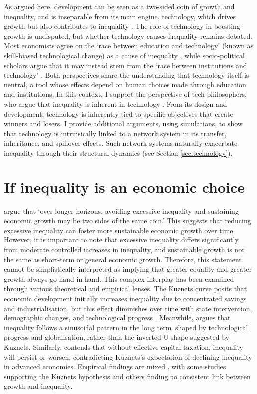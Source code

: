 \documentclass[12pt]{article}
\begin{document}
As argued here, development can be seen as a two-sided coin of growth and inequality, and is inseparable from its main engine, technology, which drives growth but also contributes to inequality \parencite{freeman2011technology}. The role of technology in boosting growth is undisputed, but whether technology causes inequality remains debated. Most economists agree on the `race between education and technology' (known as skill-biased technological change) as a cause of inequality \parencite{card2002skill}, while socio-political scholars argue that it may instead stem from the `race between institutions and technology' \parencite{kristal2017causes}. Both perspectives share the understanding that technology itself is neutral, a tool whose effects depend on human choices made through education and institutions. In this context, I support the perspective of tech philosophers, who argue that inequality is inherent in technology \parencite{miller2021technology}. From its design and development, technology is inherently tied to specific objectives that create winners and losers. I provide additional arguments, using simulations, to show that technology is intrinsically linked to a network system in its transfer, inheritance, and spillover effects. Such network systems naturally exacerbate inequality through their structural dynamics (see Section \ref{sec:technology}).


\section{If inequality is an economic choice} \label{sec:inequality}

\textcite{berg2017inequality} argue that `over longer horizons, avoiding excessive inequality and sustaining economic growth may be two sides of the same coin.' This suggests that reducing excessive inequality can foster more sustainable economic growth over time. However, it is important to note that excessive inequality differs significantly from moderate controlled increases in inequality, and sustainable growth is not the same as short-term or general economic growth. Therefore, this statement cannot be simplistically interpreted as implying that greater equality and greater growth always go hand in hand. This complex interplay has been examined through various theoretical and empirical lenses. The Kuznets curve posits that economic development initially increases inequality due to concentrated savings and industrialisation, but this effect diminishes over time with state intervention, demographic changes, and technological progress \parencite{kuznets1955economic}. Meanwhile, \textcite{milanovic2016global} argues that inequality follows a sinusoidal pattern in the long term, shaped by technological progress and globalisation, rather than the inverted U-shape suggested by Kuznets. Similarly, \textcite{piketty2014capital} contends that without effective capital taxation, inequality will persist or worsen, contradicting Kuznets's expectation of declining inequality in advanced economies. Empirical findings are mixed \parencite{martinez2020inequality}, with some studies supporting the Kuznets hypothesis and others finding no consistent link between growth and inequality.
\end{document}
